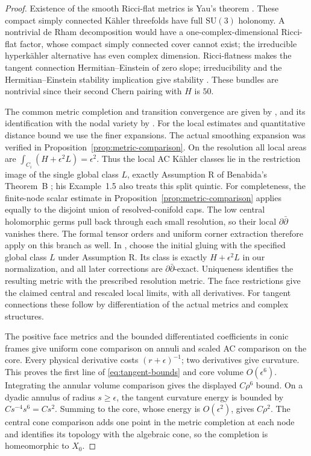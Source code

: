 \begin{proof}
Existence of the smooth Ricci-flat metrics is Yau's theorem \cite{yau}.
These compact simply connected K\"ahler threefolds have full
$\mathrm{SU}(3)$ holonomy. A nontrivial de Rham decomposition would have
a one-complex-dimensional Ricci-flat factor, whose compact simply connected
cover cannot exist; the irreducible hyperk\"ahler alternative has even
complex dimension. Ricci-flatness makes the tangent connection
Hermitian--Einstein of zero slope; irreducibility and the
Hermitian--Einstein stability implication give stability
\cite[Theorem~5.8.3]{kobayashi}. These bundles are nontrivial since their
second Chern pairing with $H$ is $50$.

The common metric completion and transition convergence are given by
\cite[Theorem~1.1]{rong-zhang}, and its identification with the nodal
variety by \cite[Theorem~1.1 and Corollary~1.2]{song}. For the local
estimates and quantitative distance bound we use the finer expansions.
The actual smoothing expansion was verified in
Proposition~\ref{prop:metric-comparison}. On the resolution all local
areas are $\int_{C_i}(H+\epsilon^2L)=\epsilon^2$. Thus the local AC
K\"ahler classes lie in the restriction image of the single global
class $L$, exactly Assumption R of Benabida's Theorem~B
\cite{benabida}; his Example~1.5 also treats this split quintic.
For completeness, the finite-node scalar estimate in
Proposition~\ref{prop:metric-comparison} applies equally to the disjoint
union of resolved-conifold caps. The low central holomorphic germs pull
back through each small resolution, so their local $\partial\bar\partial$
vanishes there. The formal tensor orders and uniform corner extraction
therefore apply on this branch as well. In \cite[\S5.3.1]{benabida},
choose the initial gluing with the specified global class $L$ under
Assumption R. Its class is exactly $H+\epsilon^2L$ in our normalization,
and all later corrections are $\partial\bar\partial$-exact. Uniqueness
identifies the resulting metric with the prescribed resolution metric.
The face restrictions give the claimed central and rescaled local
limits, with all derivatives. For tangent connections these follow
by differentiation of the actual metrics and complex structures.

The positive face metrics and the bounded differentiated coefficients
in conic frames give uniform cone comparison on annuli and scaled
AC comparison on the core. Every physical derivative costs
$(r+\epsilon)^{-1}$; two derivatives give curvature. This proves the
first line of \eqref{eq:tangent-bounds} and core volume $O(\epsilon^6)$.
Integrating the annular volume comparison gives the displayed
$C\rho^6$ bound. On a dyadic annulus of radius $s\ge\epsilon$,
the tangent curvature energy is bounded by $Cs^{-4}s^6=Cs^2$.
Summing to the core, whose energy is $O(\epsilon^2)$, gives $C\rho^2$.
The central cone comparison adds one point in the metric completion
at each node and identifies its topology with the algebraic cone,
so the completion is homeomorphic to $X_0$.


\end{proof}
